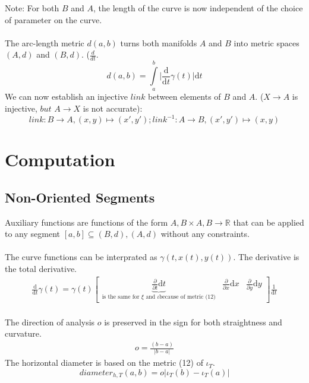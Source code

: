 \documentclass{report}
\begin{document}
Note: For both $B$ and $A$, the length of the curve is now independent of the choice of parameter on the curve. ~\cite[]{Taimanov}\\\\
The arc-length metric $d(a,b)$ turns both manifolds $A$ and $B$ into metric spaces $(A,d)$ and $(B,d)$. ($\frac{d}{dt}$. ~\cite[.3]{Klingenberg}
\begin{equation}
d(a,b) = \int \limits _{a}^{b}\lvert \frac{\mathrm{d}}{\mathrm{d}t}\gamma(t)\rvert \mathrm{d}t
\end{equation}
We can now establish an injective $link$ between elements of $B$ and $A$. ($X \rightarrow A$ is injective, $but$ $A \rightarrow X$ is not accurate):
\begin{equation}
link: B \rightarrow A, (x,y) \mapsto (x',y'); link^{-1}: A \rightarrow B, (x',y') \mapsto (x,y)
\end{equation}

\chapter{Computation}

\section{Non-Oriented Segments}
Auxiliary functions are functions of the form $A,B \times A,B \rightarrow \mathbb{R}$ that can be applied to any segment $[a,b] \subseteq (B,d),(A,d)$ without any constraints.\\\\
The curve functions can be interprated as $\gamma(t,x(t),y(t))$. The derivative is the total derivative.
\begin{align}
\frac{\mathrm{d}}{\mathrm{d} t} \gamma (t) = \gamma(t) \begin{bmatrix} \underbrace{\frac{\partial}{\partial t} \mathrm{d} t}_{\text{is the same for } \xi \text{ and } \iota \text{because of metric (12)}} & \frac{\partial}{\partial x}  \mathrm{d} x & \frac{\partial}{\partial y} \mathrm{d} y \end{bmatrix} \frac{1}{\mathrm{d}t}
\end{align}\\
The direction of analysis $o$ is preserved in the sign for both straightness and curvature.
\begin{align}
o = \frac{(b-a)}{\lvert b-a \rvert}
\end{align}
The horizontal diameter is based on the metric (12) of $\iota_{T}$.
\begin{equation}
diameter_{h,T}(a,b)= o \lvert \iota_{T}(b) - \iota_{T}(a) \rvert
\end{equation}
\end{document}
